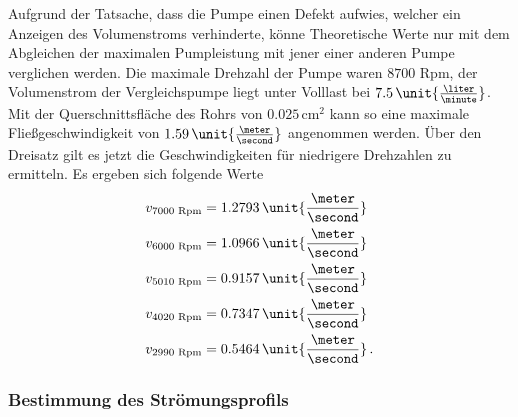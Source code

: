 Aufgrund der Tatsache, dass die Pumpe einen Defekt aufwies, welcher ein Anzeigen des Volumenstroms verhinderte, könne Theoretische Werte nur mit dem Abgleichen der maximalen Pumpleistung mit jener einer anderen Pumpe verglichen werden.
Die maximale Drehzahl der Pumpe waren $8700$ Rpm, der Volumenstrom der Vergleichspumpe liegt unter Volllast bei $7.5 \,\unit{\frac{\liter}{\minute}}$. Mit der Querschnittsfläche des Rohrs von $0.025\, \unit{\centi \meter}^2$ kann so eine maximale Fließgeschwindigkeit von
$1.59 \, \unit{\frac{\meter}{\second}}$ angenommen werden.
Über den Dreisatz gilt es jetzt die Geschwindigkeiten für niedrigere Drehzahlen zu ermitteln.
Es ergeben sich folgende Werte 
\begin{align*}
     v_{7000\text{ Rpm}}&=1.2793\, \unit{\frac{\meter}{\second}}\\
     v_{6000\text{ Rpm}}&=1.0966\, \unit{\frac{\meter}{\second}}\\
     v_{5010\text{ Rpm}}&=0.9157\, \unit{\frac{\meter}{\second}}\\
     v_{4020\text{ Rpm}}&=0.7347\, \unit{\frac{\meter}{\second}}\\
     v_{2990\text{ Rpm}}&=0.5464\, \unit{\frac{\meter}{\second}}\, .\\
\end{align*}
\subsubsection{Bestimmung des Strömungsprofils}  
\label{sec:Profil}

